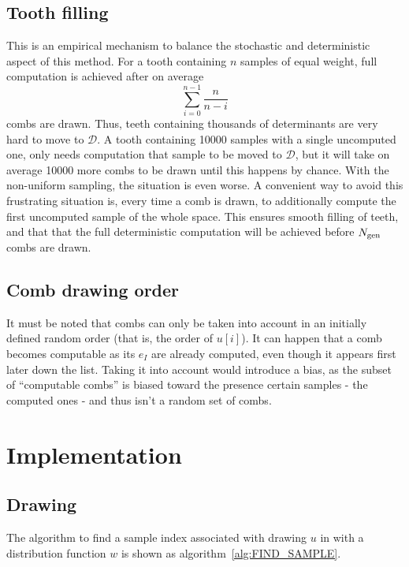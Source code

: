 \documentclass[./thesis.tex]{subfiles}
\begin{document}
\subsection{Tooth filling}

This is an empirical mechanism to balance the stochastic and deterministic aspect of this method. For a tooth containing $n$ samples of equal weight, full computation is achieved after on average
\begin{equation}
\sum_{i=0}^{n-1} \frac{n}{n-i}
\end{equation}
combs are drawn. Thus, teeth containing thousands of determinants are very hard to move to $\mathcal{D}$. A tooth containing 10000 samples with a single uncomputed one, only needs computation that sample to be moved to $\mathcal{D}$, but it will take on average 10000 more combs to be drawn until this happens by chance. With the non-uniform sampling, the situation is even worse.
A convenient way to avoid this frustrating situation is, every time a comb is drawn, to additionally compute the first uncomputed sample of the whole space. This ensures smooth filling of teeth, and that that the full deterministic computation will be achieved before ${N_\text{gen}}$ combs are drawn.


\subsection{Comb drawing order}

It must be noted that combs can only be taken into account in an initially defined random order (that is, the order of $u[i]$).
It can happen that a comb becomes computable as its $e_I$ are already computed, even though it appears first later down the list. Taking it into account would introduce a bias, as the subset of ``computable combs'' is biased toward the presence certain samples - the computed ones - and thus isn't a random set of combs.


\section{Implementation}


\subsection{Drawing}

The algorithm to find a sample index associated with drawing $u$ in with a distribution function $w$ is shown as algorithm~\ref{alg:FIND_SAMPLE}.
\end{document}
